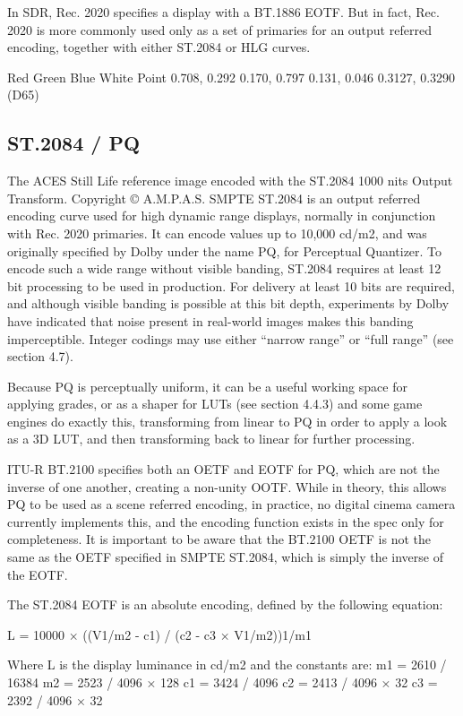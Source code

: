 In SDR, Rec. 2020 specifies a display with a BT.1886 EOTF. But in fact, Rec. 2020 is more commonly used only as a set of primaries for an output referred encoding, together with either ST.2084 or HLG curves.

Red
Green
Blue
White Point
0.708, 0.292
0.170, 0.797
0.131, 0.046
0.3127, 0.3290 (D65)

\subsection{ST.2084 / PQ}%
\label{subsec:st-2084-pq}

The ACES Still Life reference image encoded with the ST.2084 1000 nits Output Transform.
Copyright © A.M.P.A.S.
SMPTE ST.2084 is an output referred encoding curve used for high dynamic range displays, normally in conjunction with Rec. 2020 primaries. It can encode values up to 10,000 cd/m2, and was originally specified by Dolby under the name PQ, for Perceptual Quantizer. To encode such a wide range without visible banding, ST.2084 requires at least 12 bit processing to be used in production. For delivery at least 10 bits are required, and although visible banding is possible at this bit depth, experiments by Dolby have indicated that noise present in real-world images makes this banding imperceptible. Integer codings may use either “narrow range” or “full range” (see section 4.7).

Because PQ is perceptually uniform, it can be a useful working space for applying grades, or as a shaper for LUTs (see section 4.4.3) and some game engines do exactly this, transforming from linear to PQ in order to apply a look as a 3D LUT, and then transforming back to linear for further processing.

ITU-R BT.2100 specifies both an OETF and EOTF for PQ, which are not the inverse of one another, creating a non-unity OOTF. While in theory, this allows PQ to be used as a scene referred encoding, in practice, no digital cinema camera currently implements this, and the encoding function exists in the spec only for completeness. It is important to be aware that the BT.2100 OETF is not the same as the OETF specified in SMPTE ST.2084, which is simply the inverse of the EOTF.

The ST.2084 EOTF is an absolute encoding, defined by the following equation:

	L = 10000 × ((V1/m2 - c1) / (c2 - c3 × V1/m2))1/m1

Where L is the display luminance in cd/m2 and the constants are:
	m1 = 2610 / 16384
	m2 = 2523 / 4096 × 128
	c1 = 3424 / 4096
	c2 = 2413 / 4096 × 32
	c3 = 2392 / 4096 × 32




